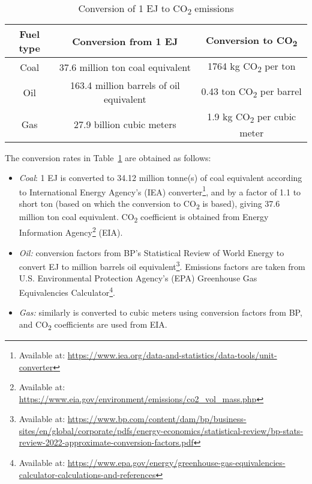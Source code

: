 \documentclass[11pt,a4paper,table,xcdraw]{article}
\begin{document}
\begin{table}[h!]
    \centering
    \caption{Conversion of 1 EJ to CO\textsubscript{2} emissions}\label{tab:ConversionRates}
    \begin{tabular}{ccc}
        \hline
        Fuel type & Conversion from 1 EJ & Conversion to CO\textsubscript{2}  \\ \hline
        Coal & 37.6 million ton coal equivalent & 1764 kg CO\textsubscript{2} per ton \\
        Oil & 163.4 million barrels of oil equivalent & 0.43 ton CO\textsubscript{2} per barrel \\
        Gas & 27.9 billion cubic meters & 1.9 kg CO\textsubscript{2} per cubic meter \\ \hline
    \end{tabular}
\end{table}

The conversion rates in Table~\ref{tab:ConversionRates} are obtained as follows:

\begin{itemize}
    \item \textit{Coal}: 1 EJ is converted to 34.12 million tonne(s) of coal equivalent according to International Energy Agency's (IEA) converter\footnote{Available at: \url{https://www.iea.org/data-and-statistics/data-tools/unit-converter}}, and by a factor of 1.1 to short ton (based on which the conversion to CO\textsubscript{2} is based), giving 37.6 million ton coal equivalent. CO\textsubscript{2} coefficient is obtained from Energy Information Agency\footnote{Available at: \url{https://www.eia.gov/environment/emissions/co2_vol_mass.php}} (EIA).
    \item \textit{Oil:} conversion factors from BP's Statistical Review of World Energy to convert EJ to million barrels oil equivalent\footnote{Available at: \url{https://www.bp.com/content/dam/bp/business-sites/en/global/corporate/pdfs/energy-economics/statistical-review/bp-stats-review-2022-approximate-conversion-factors.pdf}}. Emissions factors are taken from U.S. Environmental Protection Agency's (EPA) Greenhouse Gas Equivalencies Calculator\footnote{Available at: \url{https://www.epa.gov/energy/greenhouse-gas-equivalencies-calculator-calculations-and-references}}.
    \item \textit{Gas:} similarly is converted to cubic meters using conversion factors from BP, and CO\textsubscript{2} coefficients are used from EIA.
\end{itemize}
\end{document}
